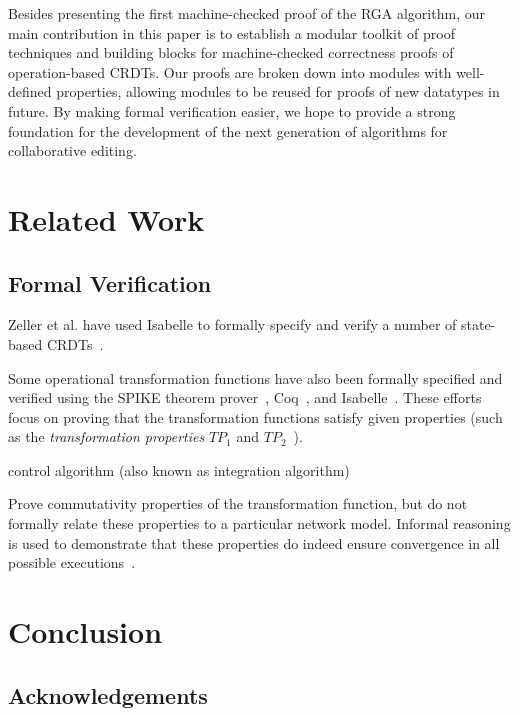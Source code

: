 \documentclass[acmlarge,review,anonymous]{acmart}\settopmatter{printfolios=true}
\begin{document}
Besides presenting the first machine-checked proof of the RGA algorithm, our main contribution in
this paper is to establish a modular toolkit of proof techniques and building blocks for
machine-checked correctness proofs of operation-based CRDTs. Our proofs are broken down into modules
with well-defined properties, allowing modules to be reused for proofs of new datatypes in future.
By making formal verification easier, we hope to provide a strong foundation for the development of
the next generation of algorithms for collaborative editing.





\section{Related Work}
\label{sect.relatedwork}


\subsection{Formal Verification}

Zeller et al. have used Isabelle to formally specify and verify a number of state-based CRDTs~\cite{Zeller:2014fl}.

Some operational transformation functions have also been formally specified and verified using the
SPIKE theorem prover~\cite{Imine:2003ks,Imine:2006kn}, Coq~\cite{Sinchuk:2016cf}, and
Isabelle~\cite{Jungnickel:2015ua}. These efforts focus on proving that the transformation functions
satisfy given properties (such as the \emph{transformation properties} $\mathit{TP}_1$ and
$\mathit{TP}_2$~\cite{Oster:2006tr,Ressel:1996wx}).

control algorithm (also known as integration algorithm)

Prove commutativity properties of the transformation function, but do not formally relate these
properties to a particular network model. Informal reasoning is used to demonstrate that these
properties do indeed ensure convergence in all possible
executions~\cite{Suleiman:1998eu,Sun:1998vf}.



\section{Conclusion}
\label{sect.conclusion}

\subsection*{Acknowledgements}

{}
\end{document}
